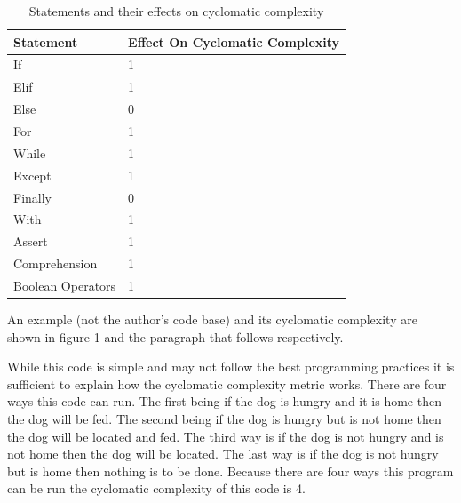 \documentclass[10.5pt,journal, a4paper]{IEEEtran}
\begin{document}
\begin{table}[H]
\centering
\caption{Statements and their effects on cyclomatic complexity}
\label{my-label}
\begin{tabular}{|l|l|}
\hline
Statement         & Effect On Cyclomatic Complexity \\ \hline
If                & 1                               \\ \hline
Elif              & 1                               \\ \hline
Else              & 0                               \\ \hline
For               & 1                               \\ \hline
While             & 1                               \\ \hline
Except            & 1                               \\ \hline
Finally           & 0                               \\ \hline
With              & 1                               \\ \hline
Assert            & 1                               \\ \hline
Comprehension     & 1                               \\ \hline
Boolean Operators & 1                               \\ \hline
\end{tabular}
\end{table}

\noindent
An example (not the author's code base) and its cyclomatic complexity are shown in figure 1 and the paragraph that follows respectively. 




\noindent
While this code is simple and may not follow the best programming practices it is sufficient to explain how the cyclomatic complexity metric works. There are four ways this code can run. The first being if the dog is hungry and it is home then the dog will be fed. The second being if the dog is hungry but is not home then the dog will be located and fed. The third way is if the dog is not hungry and is not home then the dog will be located. The last way is if the dog is not hungry but is home then nothing is to be done. Because there are four ways this program can be run the cyclomatic complexity of this code is 4.\\  
\end{document}

